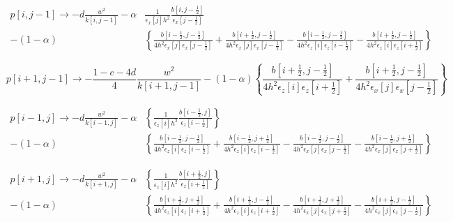 \documentclass[revised,endfloat]{geophysics}
\begin{document}
\begin{equation}
\begin{split}
p[i,j-1] \rightarrow -d \frac{w^2}{k[i,j-1]} - \alpha &\frac{1}{\epsilon_x[j] h^2} \frac{b[i,j-\frac{1}{2}]}{\epsilon_x[j-\frac{1}{2}]}  \\
- (1-\alpha) &\left\{ \frac{b[i-\frac{1}{2}, j-\frac{1}{2}]}{4h^2 \epsilon_x[j] \epsilon_x[j-\frac{1}{2}]} + \frac{b[i+\frac{1}{2}, j-\frac{1}{2}]}{4h^2 \epsilon_x[j] \epsilon_x[j-\frac{1}{2}]} - \frac{b[i-\frac{1}{2}, j-\frac{1}{2}]}{4h^2 \epsilon_z[i] \epsilon_z[i-\frac{1}{2}]} - \frac{b[i+\frac{1}{2}, j-\frac{1}{2}]}{4h^2 \epsilon_z[i] \epsilon_z[i+\frac{1}{2}]} \right\} 
\end{split}
\label{eq116}
\end{equation}

\begin{equation}
p[i+1,j-1] \rightarrow -\frac{1-c-4d}{4} \frac{w^2}{k[i+1,j-1]} - (1-\alpha)\left\{\frac{b[i+\frac{1}{2}, j-\frac{1}{2}]}{4h^2 \epsilon_z[i] \epsilon_z[i+\frac{1}{2}]} + \frac{b[i+\frac{1}{2}, j-\frac{1}{2}]}{4h^2 \epsilon_x[j] \epsilon_x[j-\frac{1}{2}]} \right\} 
\label{eq117}
\end{equation}

\begin{equation}
\begin{split}
p[i-1,j] \rightarrow -d \frac{w^2}{k[i-1,j]} - \alpha &\left\{   \frac{1}{\epsilon_z[i] h^2} \frac{b[i-\frac{1}{2},j]}{\epsilon_z[i-\frac{1}{2}]}\right\} \\
- (1-\alpha) &\left\{   \frac{b[i-\frac{1}{2}, j-\frac{1}{2}]}{4h^2 \epsilon_z[i] \epsilon_z[i-\frac{1}{2}]} + \frac{b[i-\frac{1}{2}, j+\frac{1}{2}]}{4h^2 \epsilon_z[i] \epsilon_z[i-\frac{1}{2}]} - \frac{b[i-\frac{1}{2}, j-\frac{1}{2}]}{4h^2 \epsilon_x[j] \epsilon_x[j-\frac{1}{2}]} - \frac{b[i-\frac{1}{2}, j+\frac{1}{2}]}{4h^2 \epsilon_x[j] \epsilon_x[j+\frac{1}{2}]} \right\}
\end{split}
\label{eq118}
\end{equation}

\begin{equation}
\begin{split}
p[i+1,j] \rightarrow -d\frac{w^2}{k[i+1,j]} - \alpha &\left\{\frac{1}{\epsilon_z[i] h^2} \frac{b[i+\frac{1}{2},j]}{\epsilon_z[i+\frac{1}{2}]}\right\} \\
- (1-\alpha) &\left\{ \frac{b[i+\frac{1}{2}, j+\frac{1}{2}]}{4h^2 \epsilon_z[i] \epsilon_z[i+\frac{1}{2}]} +\frac{b[i+\frac{1}{2}, j-\frac{1}{2}]}{4h^2 \epsilon_z[i] \epsilon_z[i+\frac{1}{2}]} -\frac{b[i+\frac{1}{2}, j+\frac{1}{2}]}{4h^2 \epsilon_x[j] \epsilon_x[j+\frac{1}{2}]} -\frac{b[i+\frac{1}{2}, j-\frac{1}{2}]}{4h^2 \epsilon_x[j] \epsilon_x[j-\frac{1}{2}]} \right\}
\end{split} 
\label{eq119}
\end{equation}
\end{document}
